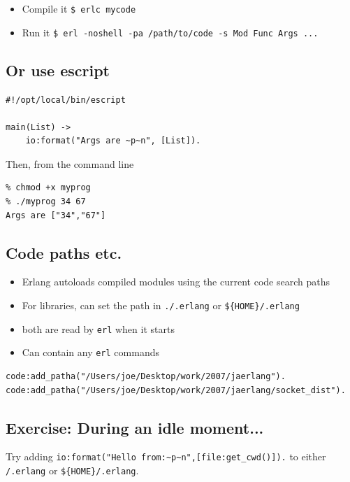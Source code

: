 \documentclass[12pt]{article}
\begin{document}
\begin{itemize}
\item Compile it \verb+$ erlc mycode+
\item Run it \verb+$ erl -noshell -pa /path/to/code -s Mod Func Args ...+
\end{itemize}

\subsection{Or use escript}

\begin{verbatim}
#!/opt/local/bin/escript 

main(List) ->
    io:format("Args are ~p~n", [List]).
\end{verbatim}

Then, from the command line

\begin{verbatim}
% chmod +x myprog
% ./myprog 34 67
Args are ["34","67"]
\end{verbatim}

\subsection{Code paths etc.}

\begin{itemize}
\item Erlang autoloads compiled modules using the current code search paths

\item For libraries, can set the path in \verb+./.erlang+ or \verb+${HOME}/.erlang+
\item both are read by \verb+erl+ when it starts

\item Can contain any \verb+erl+ commands 
\end{itemize}

\begin{verbatim}
code:add_patha("/Users/joe/Desktop/work/2007/jaerlang").
code:add_patha("/Users/joe/Desktop/work/2007/jaerlang/socket_dist").
\end{verbatim}

\subsection{Exercise:  During an idle moment...}

Try adding \verb+io:format("Hello from:~p~n",[file:get_cwd()]).+ 
to either \verb+/.erlang+ or \verb+${HOME}/.erlang+.
\end{document}
